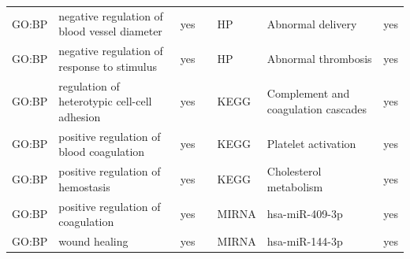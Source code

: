 \begin{longtable}{@{}lp{4cm}lllp{4cm}l@{}}
GO:BP           & negative regulation of blood vessel diameter                                                                                       & yes              &           & HP              & Abnormal delivery                                                                                                                                                      & yes              \\
GO:BP           & negative regulation of response to stimulus                                                                                        & yes              &           & HP              & Abnormal thrombosis                                                                                                                                                    & yes              \\
GO:BP           & regulation of heterotypic cell-cell adhesion                                                                                       & yes              &           & KEGG            & Complement and coagulation cascades                                                                                                                                    & yes              \\
GO:BP           & positive regulation of blood coagulation                                                                                           & yes              &           & KEGG            & Platelet activation                                                                                                                                                    & yes              \\
GO:BP           & positive regulation of hemostasis                                                                                                  & yes              &           & KEGG            & Cholesterol metabolism                                                                                                                                                 & yes              \\
GO:BP           & positive regulation of coagulation                                                                                                 & yes              &           & MIRNA           & hsa-miR-409-3p                                                                                                                                                         & yes              \\
GO:BP           & wound healing                                                                                                                      & yes              &           & MIRNA           & hsa-miR-144-3p                                                                                                                                                         & yes              \\

\end{longtable}
